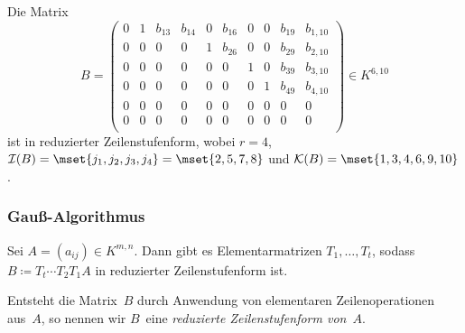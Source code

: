 \documentclass[a4paper]{article}
\begin{document}
\begin{example}\label{ex:redechelon}
    Die Matrix
    \begin{equation*}
        B = \begin{pmatrix}
            0 & 1 & b_{13} & b_{14} & 0 & b_{16} & 0 & 0 & b_{19} & b_{1, 10} \\
            0 & 0 & 0      & 0      & 1 & b_{26} & 0 & 0 & b_{29} & b_{2, 10} \\
            0 & 0 & 0      & 0      & 0 & 0      & 1 & 0 & b_{39} & b_{3, 10} \\
            0 & 0 & 0      & 0      & 0 & 0      & 0 & 1 & b_{49} & b_{4, 10} \\
            0 & 0 & 0      & 0      & 0 & 0      & 0 & 0 & 0      & 0         \\
            0 & 0 & 0      & 0      & 0 & 0      & 0 & 0 & 0      & 0         \\
        \end{pmatrix} \in K^{6, 10}
    \end{equation*}
    ist in reduzierter Zeilenstufenform, wobei $r = 4$, $\mathcal{I}(B) = \mset{j_1,j_2,j_3,j_4} = \mset{2, 5, 7, 8}$ und $\mathcal{K}(B) = \mset{1, 3, 4, 6, 9, 10}$.
\end{example}

\subsubsection{Gauß-Algorithmus}

\begin{theorem}\label{thm:gauss}
    Sei $A = (a_{ij}) \in K^{m,n}$. Dann gibt es Elementarmatrizen $T_1,\dots,T_t$, sodass $B \coloneqq T_t\cdots T_2T_1A$ in reduzierter Zeilenstufenform ist.
\end{theorem}

\begin{definition}
    Entsteht die Matrix~$B$ durch Anwendung von elementaren Zeilenoperationen aus~$A$, so nennen wir $B$~eine \emph{reduzierte Zeilenstufenform von~$A$}.
\end{definition}
\end{document}
